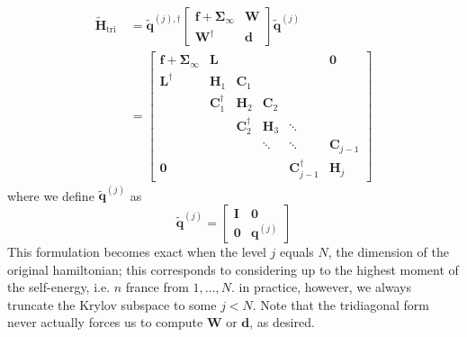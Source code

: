 \begin{align}
\tilde{\mathbf{H}}_{\text {tri }} & =\tilde{\mathbf{q}}^{(j),\dagger}\left[\begin{array}{cc}
\mathbf{f}+\boldsymbol{\Sigma}_{\infty} & \mathbf{W} \\
\mathbf{W}^{\dagger} & \mathbf{d}
\end{array}\right] \tilde{\mathbf{q}}^{(j)} \\
& =\left[\begin{array}{cccccc}
\mathbf{f}+\boldsymbol{\Sigma}_{\infty} & \mathbf{L} & & & & \mathbf{0} \\
\mathbf{L}^{\dagger} & \mathbf{H}_{1} & \mathbf{C}_{1} & & & \\
& \mathbf{C}_{1}^{\dagger} & \mathbf{H}_{2} & \mathbf{C}_{2} & & \\
& & \mathbf{C}_{2}^{\dagger} & \mathbf{H}_{3} & \ddots & \\
& & & \ddots & \ddots & \mathbf{C}_{j-1} \\
\mathbf{0} & & & & \mathbf{C}_{j-1}^{\dagger} & \mathbf{H}_{j}
\end{array}\right]
\label{eq:tridiagonal}
\end{align}
where we define $\tilde{\mathbf{q}}^{(j)}$ as
\begin{equation}
    \tilde{\mathbf{q}}^{(j)}=\left[\begin{array}{cc}
\mathbf{I} & \mathbf{0} \\
\mathbf{0} & \mathbf{q}^{(j)}
\end{array}\right]
\end{equation}
This formulation becomes exact when the level $j$ equals $N$, the dimension of the original hamiltonian; this corresponds to considering up to the highest moment of the self-energy, i.e. $n$ france from $1,\ldots,N$. in practice, however, we always truncate the Krylov subspace to some $j<N$. Note that the tridiagonal form never actually forces us to compute $\mathbf{W}$ or $\mathbf{d}$, as desired.

